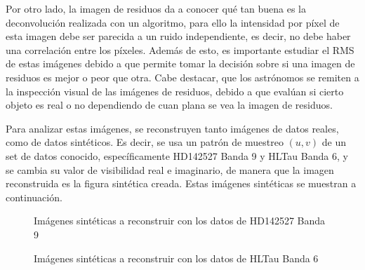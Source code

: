 Por otro lado, la imagen de residuos da a conocer qué tan buena es la deconvolución realizada con un algoritmo, para ello la intensidad por píxel de esta imagen debe ser parecida a un ruido independiente, es decir, no debe haber una correlación entre los píxeles. Además de esto, es importante estudiar el RMS de estas imágenes debido a que permite tomar la decisión sobre si una imagen de residuos es mejor o peor que otra. Cabe destacar, que los astrónomos se remiten a la inspección visual de las imágenes de residuos, debido a que evalúan si cierto objeto es real o no dependiendo de cuan plana se vea la imagen de residuos.

Para analizar estas imágenes, se reconstruyen tanto imágenes de datos reales, como de datos sintéticos. Es decir, se usa un patrón de muestreo $(u,v)$ de un set de datos conocido, específicamente HD142527 Banda 9 y HLTau Banda 6, y se cambia su valor de visibilidad real e imaginario, de manera que la imagen reconstruida es la figura sintética creada. Estas imágenes sintéticas se muestran a continuación.

\begin{figure}[h!]
\centering
{}\hspace*{0.0cm}

\hspace*{0.0cm}
\label{fig:phantoms}
\caption{Imágenes sintéticas a reconstruir con los datos de HD142527 Banda 9}
\end{figure}

\clearpage

\begin{figure}[h!]
\centering
{}\hspace*{0.0cm}

\hspace*{0.0cm}
\label{fig:phantoms2}
\caption{Imágenes sintéticas a reconstruir con los datos de HLTau Banda 6}
\end{figure}

